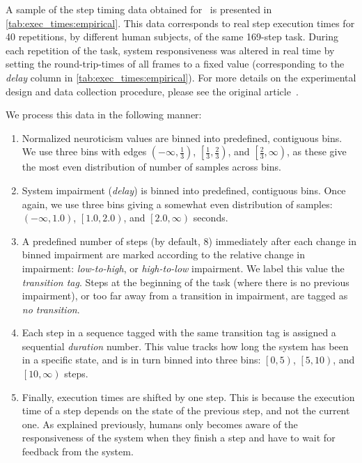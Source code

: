 A sample of the step timing data obtained for~\cite{olguinmunoz:impact2021} is presented in \cref{tab:exec_times:empirical}.
This data corresponds to real step execution times for \num{40} repetitions, by different human subjects, of the same \num{169}-step task.
During each repetition of the task, system responsiveness was altered in real time by setting the round-trip-times of all frames to a fixed value (corresponding to the \emph{delay} column in \cref{tab:exec_times:empirical}).
For more details on the experimental design and data collection procedure, please see the original article~\cite{olguinmunoz:impact2021}.

We process this data in the following manner:



\begin{enumerate}
    \item Normalized neuroticism values are binned into predefined, contiguous bins.
    We use three bins with edges
    \( \left(-\infty, \frac{1}{3}\right) \),
    \( \left[\frac{1}{3}, \frac{2}{3}\right) \),
    and \( \left[\frac{2}{3}, \infty\right) \),
    as these give the most even distribution of number of samples across bins.

    \item System impairment (\emph{delay}) is binned into predefined, contiguous bins.
    Once again, we use three bins giving a somewhat even distribution of samples:
    \( \left(-\infty, 1.0\right) \),
    \( \left[1.0, 2.0\right) \),
    and \( \left[2.0, \infty\right) \) seconds.

    \item A predefined number of steps (by default, \num{8}) immediately after each change in binned impairment are marked according to the relative change in impairment: \emph{low-to-high}, or \emph{high-to-low} impairment.
    We label this value the \emph{transition tag}.
    Steps at the beginning of the task (where there is no previous impairment), or too far away from a transition in impairment, are tagged as \emph{no transition}.

    \item Each step in a sequence tagged with the same transition tag is assigned a sequential \emph{duration} number.
    This value tracks how long the system has been in a specific state, and is in turn binned into three bins:
    \( \left[0, 5\right) \),
    \( \left[5, 10\right) \),
    and \( \left[10, \infty\right) \) steps.

    \item Finally, execution times are shifted by one step.
    This is because the execution time of a step depends on the state of the previous step, and not the current one.
    As explained previously, humans only becomes aware of the responsiveness of the system when they finish a step and have to wait for feedback from the system.
\end{enumerate}


